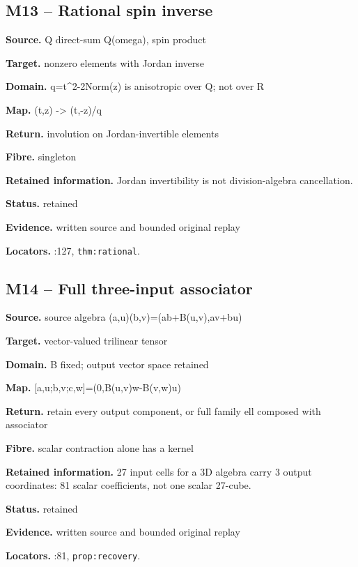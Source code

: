 \subsection*{M13 -- Rational spin inverse}
\noindent\textbf{Source.} Q direct-sum Q(omega), spin product\par
\noindent\textbf{Target.} nonzero elements with Jordan inverse\par
\noindent\textbf{Domain.} q=t\textasciicircum{}2-2Norm(z) is anisotropic over Q; not over R\par
\noindent\textbf{Map.} (t,z) -> (t,-z)/q\par
\noindent\textbf{Return.} involution on Jordan-invertible elements\par
\noindent\textbf{Fibre.} singleton\par
\noindent\textbf{Retained information.} Jordan invertibility is not division-algebra cancellation.\par
\noindent\textbf{Status.} retained\par
\noindent\textbf{Evidence.} written source and bounded original replay\par
\noindent\textbf{Locators.} :127, \texttt{thm:rational}.
\subsection*{M14 -- Full three-input associator}
\noindent\textbf{Source.} source algebra (a,u)(b,v)=(ab+B(u,v),av+bu)\par
\noindent\textbf{Target.} vector-valued trilinear tensor\par
\noindent\textbf{Domain.} B fixed; output vector space retained\par
\noindent\textbf{Map.} [a,u;b,v;c,w]=(0,B(u,v)w-B(v,w)u)\par
\noindent\textbf{Return.} retain every output component, or full family ell composed with associator\par
\noindent\textbf{Fibre.} scalar contraction alone has a kernel\par
\noindent\textbf{Retained information.} 27 input cells for a 3D algebra carry 3 output coordinates: 81 scalar coefficients, not one scalar 27-cube.\par
\noindent\textbf{Status.} retained\par
\noindent\textbf{Evidence.} written source and bounded original replay\par
\noindent\textbf{Locators.} :81, \texttt{prop:recovery}.
